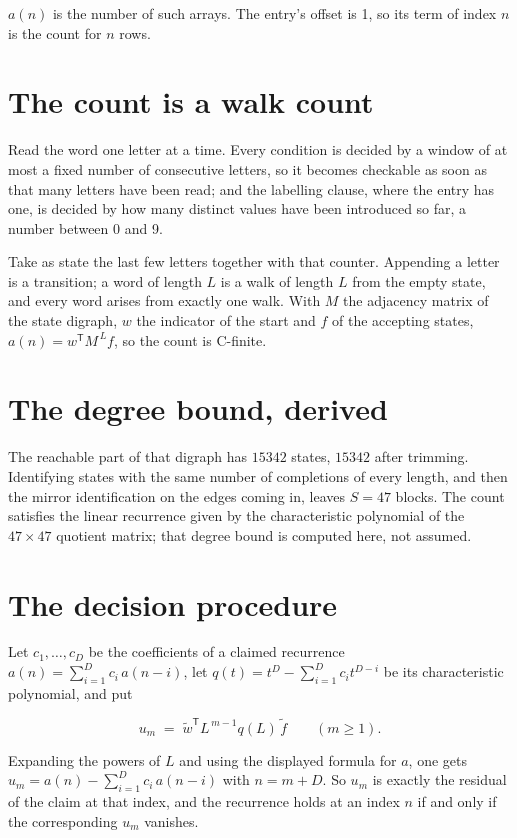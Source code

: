 \documentclass[11pt]{article}
\theoremstyle{definition}
\begin{document}
$a(n)$ is the number of such arrays. The entry's offset is 1, so its term of index $n$ is the count for $n$ rows.

\section{The count is a walk count}

Read the word one letter at a time. Every condition is decided by a window of at most a fixed number of consecutive letters, so it becomes checkable as soon as that many letters have been read; and the labelling clause, where the entry has one, is decided by how many distinct values have been introduced so far, a number between $0$ and 9.

Take as state the last few letters together with that counter. Appending a letter is a transition; a word of length $L$ is a walk of length $L$ from the empty state, and every word arises from exactly one walk. With $M$ the adjacency matrix of the state digraph, $w$ the indicator of the start and $f$ of the accepting states, $a(n) = w^{\mathsf T}M^{\,L}f$, so the count is C-finite.

\section{The degree bound, derived}

The reachable part of that digraph has $15342$ states, $15342$ after trimming. Identifying states with the same number of completions of every length, and then the mirror identification on the edges coming in, leaves $S = 47$ blocks. The count satisfies the linear recurrence given by the characteristic polynomial of the $47\times47$ quotient matrix; that degree bound is computed here, not assumed.

\section{The decision procedure}

Let $c_1,\dots,c_D$ be the coefficients of a claimed recurrence $a(n) = \sum_{i=1}^{D} c_i\,a(n-i)$, let $q(t) = t^{D} - \sum_{i=1}^{D} c_i t^{D-i}$ be its characteristic polynomial, and put

\[u_m \;=\; \tilde w^{\mathsf T} L^{\,m-1} q(L)\,\tilde f \qquad (m \ge 1).\]

Expanding the powers of $L$ and using the displayed formula for $a$, one gets $u_m = a(n) - \sum_{i=1}^{D} c_i\,a(n-i)$ with $n = m + D$. So $u_m$ is exactly the residual of the claim at that index, and the recurrence holds at an index $n$ if and only if the corresponding $u_m$ vanishes.
\end{document}
